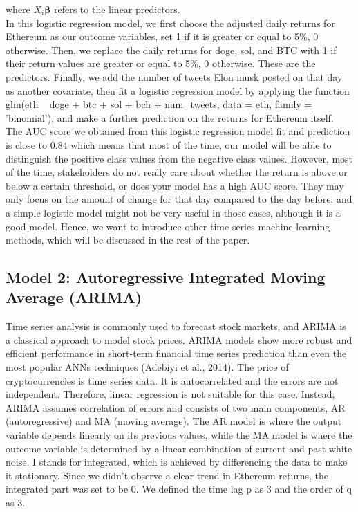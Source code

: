 \documentclass{article}
\begin{document}
\noindent where $X_i\bm{\beta}$ refers to the linear predictors.\\

\noindent In this logistic regression model, we first choose the adjusted daily returns for Ethereum as our outcome variables, set 1 if it is greater or equal to 5\%, 0 otherwise. Then, we replace the daily returns for doge, sol, and BTC with 1 if their return values are greater or equal to 5\%, 0 otherwise. These are the predictors. Finally, we add the number of tweets Elon musk posted on that day as another covariate, then fit a logistic regression model by applying the function glm(eth ~ doge + btc + sol + bch + num\_tweets, data = eth, family = 'binomial'), and make a further prediction on the returns for Ethereum itself.\\

\noindent The AUC score we obtained from this logistic regression model fit and prediction is close to 0.84 which means that most of the time, our model will be able to distinguish the positive class values from the negative class values. However, most of the time, stakeholders do not really care about whether the return is above or below a certain threshold, or does your model has a high AUC score. They may only focus on the amount of change for that day compared to the day before, and a simple logistic model might not be very useful in those cases, although it is a good model. Hence, we want to introduce other time series machine learning methods, which will be discussed in the rest of the paper. \\

\subsection{Model 2: Autoregressive Integrated Moving Average (ARIMA)}
Time series analysis is commonly used to forecast stock markets, and ARIMA is a classical approach to model stock prices. ARIMA models show more robust and efficient performance in short-term financial time series prediction than even the most popular ANNs techniques (Adebiyi et al., 2014). The price of cryptocurrencies is time series data. It is autocorrelated and the errors are not independent. Therefore, linear regression is not suitable for this case. Instead, ARIMA assumes correlation of errors and consists of two main components, AR (autoregressive) and MA (moving average). The AR model is where the output variable depends linearly on its previous values, while the MA model is where the outcome variable is determined by a linear combination of current and past white noise. I stands for integrated, which is achieved by differencing the data to make it stationary. Since we didn’t observe a clear trend in Ethereum returns, the integrated part was set to be 0. We defined the time lag p as 3 and the order of q as 3.\\
\end{document}
